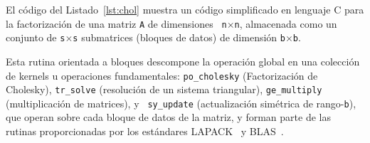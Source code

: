

El código del Listado~\ref{lst:chol} muestra un código simplificado en
lenguaje C para la factorización de una matriz {\tt A} de dimensiones {\tt
  n}$\times${\tt n}, almacenada como un conjunto de {\tt s}$\times${\tt s}
submatrices (bloques de datos) de dimensión {\tt b}$\times${\tt b}.

Esta rutina orientada a bloques descompone la operación global en una
colección de kernels u operaciones fundamentales: {\tt po\_cholesky}
(Factorización de Cholesky), {\tt tr\_solve} (resolución de un sistema
triangular), {\tt ge\_multiply} (multiplicación de matrices), y {\tt
  sy\_update} (actualización simétrica de rango-{\tt b}), que operan sobre
cada bloque de datos de la matriz, y forman parte de las rutinas
proporcionadas por los estándares LAPACK~\cite{lapackweb} y BLAS~\cite{OpenBLAS}.


